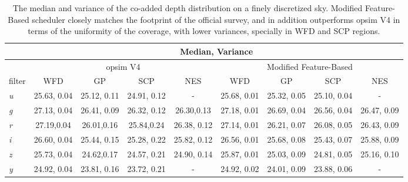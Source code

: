 \documentclass[12pt]{aastex62}
\theoremstyle{definition}
\begin{document}
\begin{table}
\caption{The median and variance of the co-added depth distribution on a finely discretized sky. Modified Feature-Based scheduler closely matches the footprint of the official survey, and in addition outperforms opsim V4 in terms of the uniformity of the coverage, with lower variances, specially in WFD and SCP regions.}\label{table_10yrs_hist}
\begin{center}
\begin{tabular}{l|cccc|cccc} \hline
&\multicolumn{8}{c}{Median, Variance} \\ \hline
&\multicolumn{4}{c|}{opsim V4} &\multicolumn{4}{c}{Modified Feature-Based} \\
filter  & WFD & GP & SCP & NES & WFD & GP & SCP & NES\\
\hline
\textit{u}& 25.63, 0.04 & 25.12, 0.11& 24.91, 0.12& - &25.68, 0.01 &25.32, 0.05 & 25.10, 0.04& -\\
\textit{g}& 27.13, 0.04 & 26.41, 0.09& 26.32, 0.12 & 26.30,0.13& 27.18, 0.01 & 26.69, 0.04&26.56, 0.04 &26.47, 0.09 \\
\textit{r}& 27.19,0.04 & 26.01,0.16& 25.84,0.24 & 26.38, 0.12 & 27.14, 0.01& 26.21, 0.07 & 26.08, 0.05 & 26.43, 0.09\\
\textit{i}& 26.60, 0.04 & 25.44, 0.15 & 25.28, 0.22 & 25.82, 0.12 & 26.56, 0.01 & 25.68, 0.08 & 25.43, 0.07 & 25.88, 0.09\\
\textit{z}& 25.73, 0.04& 24.62,0.17& 24.57, 0.21& 24.90, 0.14 & 25.87, 0.01 & 25.03, 0.09 & 24.81, 0.05 & 25.16, 0.10\\
\textit{y}& 24.92, 0.04 & 23.81, 0.16 & 23.72, 0.21& - & 24.92, 0.02 & 24.01, 0.09 &23.88, 0.06 & -\\
\end{tabular}
\end{center}
\end{table}

\end{document}
